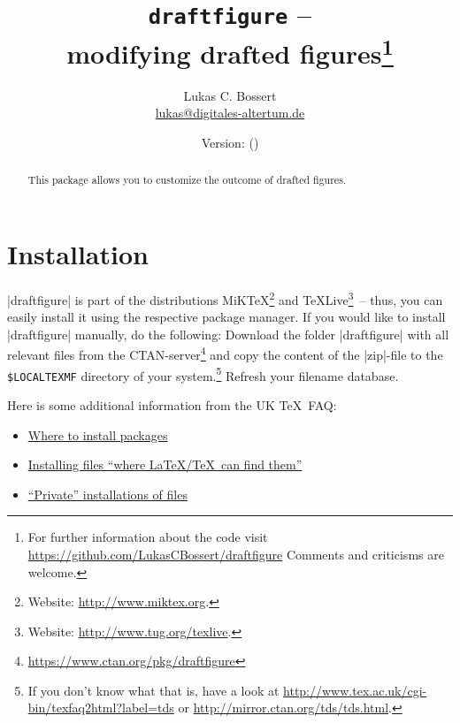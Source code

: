 \documentclass[a4paper,
10pt,
english
]{ltxdoc}
\newcommand\df{draftfigure\xspace}
\newcommand\dfstring{|draftfigure|\xspace}
\begin{document}
\title{\texttt{\df} -- \\ modifying drafted figures\footnote{%
For further information about the code visit \href{https://github.com/LukasCBossert/draftfigure}{https://github.com/LukasCBossert/draftfigure}
Comments and criticisms are welcome.}}
\author{Lukas C. Bossert\\{\small \href{mailto:lukas@digitales-altertum.de}{lukas@digitales-altertum.de}}}
\date{Version: \dfdate{} (\dfversion)} 
\maketitle

\begin{abstract}
\noindent This package allows you to customize the outcome of drafted figures.
\end{abstract}


\begin{multicols}{2}
\footnotesize\parskip=0mm \tableofcontents
\end{multicols}

\section{Installation}
\dfstring is part of the distributions MiK\TeX \footnote{Website: \url{http://www.miktex.org}.} 
and \TeX Live\footnote{Website: \url{http://www.tug.org/texlive}.}~-- thus, you
can easily install it using the respective package manager. 
If you would like to
install \dfstring manually, do the following:
Download the folder \dfstring with all relevant files from the CTAN-server\footnote{\url{https://www.ctan.org/pkg/\df}} and copy the content of the |zip|-file to the \texttt{\$LOCALTEXMF} directory of
 your system.\footnote{If you don't know what that is, have a look at
\url{http://www.tex.ac.uk/cgi-bin/texfaq2html?label=tds} or 
\url{http://mirror.ctan.org/tds/tds.html}.} 
Refresh your filename database.

Here is some additional information from the UK \TeX\ FAQ:
\begin{itemize}[nosep,after=\vspace{-\baselineskip} ]
  \item \href{%
    http://www.tex.ac.uk/cgi-bin/texfaq2html?label=install-where}{%
    Where to install packages}
  \item \href{%
    http://www.tex.ac.uk/cgi-bin/texfaq2html?label=inst-wlcf}{%
    Installing files \enquote{where \LaTeX /TeX\ can find them}}
  \item \href{%
    http://www.tex.ac.uk/cgi-bin/texfaq2html?label=privinst}{%
    \enquote{Private} installations of files}
\end{itemize}
\end{document}
